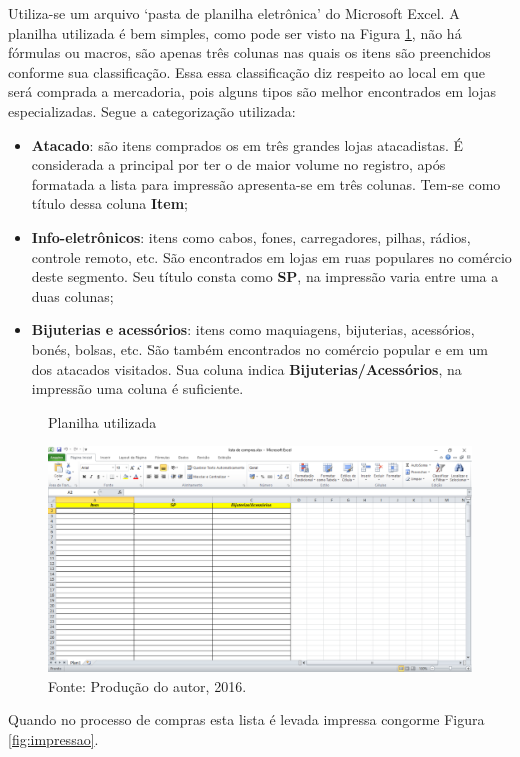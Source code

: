 \documentclass[12pt]{article}
\begin{document}
Utiliza-se um arquivo `pasta de planilha eletrônica' do Microsoft Excel. A planilha utilizada é bem simples, como pode ser visto na Figura  \ref{fig:planilha}, não há fórmulas ou macros, são apenas três colunas nas quais os itens são preenchidos conforme sua classificação. Essa essa classificação diz respeito ao local em que será comprada a mercadoria, pois alguns tipos são melhor encontrados em lojas especializadas. Segue a categorização utilizada:

\begin{itemize}
\item \textbf{Atacado}: são itens comprados os em três grandes lojas atacadistas. É considerada a principal por ter o de maior volume no registro, após formatada a lista para impressão apresenta-se em três colunas. Tem-se como título dessa coluna \textbf{Item};
\item \textbf{Info-eletrônicos}: itens como cabos, fones, carregadores, pilhas, rádios, controle remoto, etc. São encontrados em lojas em ruas populares no comércio deste segmento. Seu título consta como \textbf{SP}, na impressão varia entre uma a duas colunas;
\item \textbf{Bijuterias e acessórios}: itens como maquiagens, bijuterias, acessórios, bonés, bolsas, etc. São também encontrados no comércio popular e em um dos atacados visitados. Sua coluna indica \textbf{Bijuterias/Acessórios}, na impressão uma coluna é suficiente.
\end{itemize}

\begin{figure}[ht]
\caption{Planilha utilizada}\label{fig:planilha}
\centering
\includegraphics[width=\textwidth,keepaspectratio]{figures/lista-excel.pdf}
\caption*{\footnotesize Fonte: Produção do autor, 2016.}
\end{figure}

Quando no processo de compras esta lista é levada impressa congorme Figura \ref{fig:impressao}.
\end{document}
